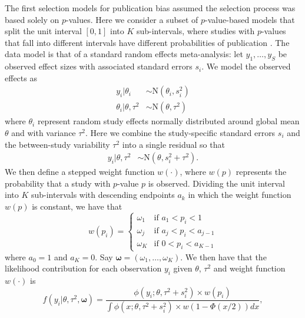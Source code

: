 \documentclass[12pt]{article}   	%
\numberwithin{equation}{section}
\begin{document}
The first selection models for publication bias assumed the selection process was based solely on $p$-values. Here we consider a subset of $p$-value-based models that split the unit interval $[0, 1]$ into $K$ sub-intervals, where studies with $p$-values that fall into different intervals have different probabilities of publication \citep{hedges1992selection, vevea1995pubbias, vevea2005sensitivity}. The data model is that of a standard random effects meta-analysis: let $y_1, \dots, y_S$ be observed effect sizes with associated standard errors $s_i$.  We model the observed effects as
\begin{align}
y_i \vert \theta_i & \sim \mbox{N}(\theta_i, s_i ^ 2)  \label{eq:y} \\
\theta_i \vert \theta, \tau ^ 2 & \sim \mbox{N}(\theta, \tau ^ 2) \label{eq:thetai}
\end{align}
where $\theta_i$ represent random study effects normally distributed around global mean $\theta$ and with variance $\tau^2$. Here we combine the study-specific standard errors $s_i$ and the between-study variability $\tau^2$ into a single residual so that 
\begin{align}
y_i \vert \theta, \tau^2 &\sim \text{N}(\theta, s_i^2 + \tau^2).
\end{align}
We then define a stepped weight function $w(\cdot)$, where $w(p)$ represents the probability that a study with $p$-value $p$ is observed. Dividing the unit interval into $K$ sub-intervals with descending endpoints $a_k$ in which the weight function $w(p)$ is constant, we have that
\begin{equation} %
w(p_i) =
	\begin{cases}
		\omega_1 & \text{if $a_1 < p_i < 1$} \\
		\omega_j & \text{if $a_{j} < p_i < a_{j-1}$} \\
		\omega_K & \text{if $0 < p_i < a_{K-1}$}
	\end{cases} \label{eq:weight_fcn}
\end{equation}
where $a_0 = 1$ and $a_K = 0$. Say $\boldsymbol{\omega} = (\omega_1, \dots, \omega_K)$. We then have that the likelihood contribution for each observation $y_i$ given $\theta$, $\tau^2$ and weight function $w(\cdot)$ is 
\begin{equation} %
f(y_i \vert \theta, \tau^2, \boldsymbol{\omega}) = \frac{\phi(y_i ; \theta, \tau^2 + s_i^2) \times w(p_i)}{\int \phi(x ; \theta, \tau^2 + s_i^2) \times w(1 - \Phi(x/2)) dx}, \label{eq:weightednormal}
\end{equation}
\end{document}
